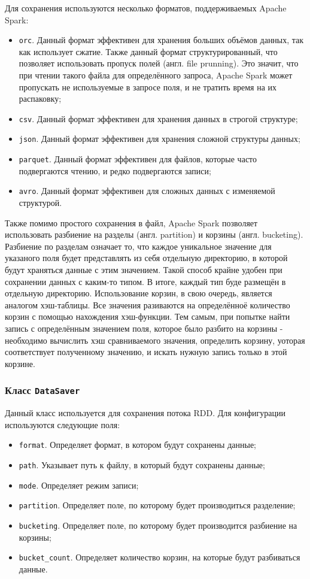 Для сохранения используются несколько форматов, поддерживаемых Apache Spark:
\begin{itemize}
    \item \texttt{orc}. Данный формат эффективен для хранения больших объёмов данных, так как использует сжатие. Также данный формат структурированный, что позволяет использовать пропуск полей (англ. file prunning). Это значит, что при чтении такого файла для определённого запроса, Apache Spark может пропускать не используемые в запросе поля, и не тратить время на их распаковку;
    \item \texttt{csv}. Данный формат эффективен для хранения данных в строгой структуре;
    \item \texttt{json}. Данный формат эффективен для хранения сложной структуры данных;
    \item \texttt{parquet}. Данный формат эффективен для файлов, которые часто подвергаются чтению, и редко подвергаются записи;
    \item \texttt{avro}. Данный формат эффективен для сложных данных с изменяемой структурой.
\end{itemize}

Также помимо простого сохранения в файл, Apache Spark позволяет использовать разбиение на разделы (англ. partition) и корзины (англ. bucketing).
Разбиение по разделам означает то, что каждое уникальное значение для указаного поля будет представлять из себя отдельную директорию, в которой будут храняться данные с этим значением.
Такой способ крайне удобен при сохранении данных с каким-то типом.
В итоге, каждый тип буде размещён в отдельную директорию.
Использование корзин, в свою очередь, является аналогом хэш-таблицы.
Все значения разиваются на определённоё количество корзин с помощью нахождения хэш-функции.
Тем самым, при попытке найти запись с определённым значением поля, которое было разбито на корзины - необходимо вычислить хэш сравниваемого значения, определить корзину, уоторая соответствует полученному значению, и искать нужную запись только в этой корзине.

\subsubsection{Класс \texttt{DataSaver}}
Данный класс используется для сохранения потока RDD.
Для конфигурации используются следующие поля:
\begin{itemize}
    \item \texttt{format}. Определяет формат, в котором будут сохранены данные;
    \item \texttt{path}. Указывает путь к файлу, в который будут сохранены данные;
    \item \texttt{mode}. Определяет режим записи;
    \item \texttt{partition}. Определяет поле, по которому будет производиться разделение;
    \item \texttt{bucketing}. Определяет поле, по которому будет производится разбиение на корзины;
    \item \texttt{bucket\_count}. Определяет количество корзин, на которые будут разбиваться данные.
\end{itemize}

